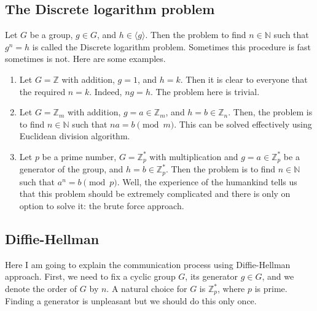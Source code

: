 \subsection{The Discrete logarithm problem}\label{section::DiscreteLog}

Let $G$ be  a group, $g\in G$, and $h \in \langle g\rangle$. Then the problem to find $n\in \mathbb N$ such that $g^n = h$ is called the Discrete logarithm problem. Sometimes this procedure is fast sometimes is not. Here are some examples.

\begin{examples}
\begin{enumerate}
\item Let $G = \mathbb Z$ with addition, $g = 1$, and $h = k$. Then it is clear to everyone that the required $n = k$. Indeed, $ng = h$. The problem here is trivial.

\item Let $G = \mathbb Z_m$ with addition, $g = a\in \mathbb Z_m$, and $h = b\in \mathbb Z_n$. Then, the problem is to find $n\in\mathbb N$ such that $na = b \pmod m$. This can be solved effectively using Euclidean division algorithm.

\item Let $p$ be a prime number, $G = \mathbb Z_p^*$ with multiplication and $g = a\in \mathbb Z_p^*$ be a generator of the group, and $h = b\in \mathbb Z_p^*$. Then the problem is to find $n\in \mathbb N$ such that $a^n = b \pmod p$. Well, the experience of the humankind tells us that this problem should be extremely complicated and there is only on option to solve it: the brute force approach.
\end{enumerate}
\end{examples}

\subsection{Diffie-Hellman}

Here I am going to explain the communication process using Diffie-Hellman approach. First, we need to fix a cyclic group $G$, its generator $g\in G$, and we denote the order of $G$ by $n$. A natural choice for $G$ is $\mathbb Z_p^*$, where $p$ is prime. Finding a generator is unpleasant but we should do this only once.

